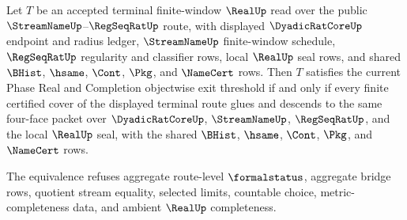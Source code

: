 \begin{theorem}
\label{thm:real-l10-terminal-finite-cover-threshold-equivalence}
Let $T$ be an accepted terminal finite-window $\RealUp$ read over the public
$\StreamNameUp$--$\RegSeqRatUp$ route, with displayed $\DyadicRatCoreUp$
endpoint and radius ledger, $\StreamNameUp$ finite-window schedule,
$\RegSeqRatUp$ regularity and classifier rows, local $\RealUp$ seal rows, and
shared $\BHist$, $\hsame$, $\Cont$, $\Pkg$, and $\NameCert$ rows. Then $T$
satisfies the current Phase Real and Completion objectwise exit threshold if
and only if every finite certified cover of the displayed terminal route glues
and descends to the same four-face packet over $\DyadicRatCoreUp$,
$\StreamNameUp$, $\RegSeqRatUp$, and the local $\RealUp$ seal, with the shared
$\BHist$, $\hsame$, $\Cont$, $\Pkg$, and $\NameCert$ rows.

The equivalence refuses aggregate route-level $\formalstatus$, aggregate
bridge rows, quotient stream equality, selected limits, countable choice,
metric-completeness data, and ambient $\RealUp$ completeness.
\end{theorem}

